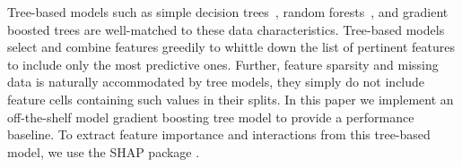 
Tree-based models such as simple decision trees~\citep{decision_trees}, random forests~\citep{randomforests}, and gradient boosted trees \citep{gradient_boosted_decision_trees_gbdt} are well-matched to these data characteristics. Tree-based models select and combine features greedily to whittle down the list of pertinent features to include only the most predictive ones. Further, feature sparsity and missing data is naturally accommodated by tree models, they simply do not include feature cells containing such values in their splits.  In this paper we implement an off-the-shelf model gradient boosting tree model to provide a performance baseline. To extract feature importance and interactions from this tree-based model, we use the SHAP package \citep{shap1,shap2}.%

